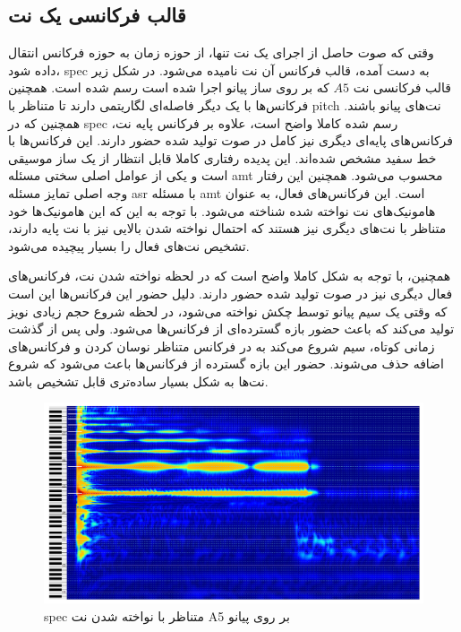 \subsection{قالب فرکانسی یک نت}
وقتی که صوت حاصل از اجرای یک نت تنها، از حوزه زمان به حوزه فرکانس انتقال داده
شود، \gls{spec} به دست آمده، قالب فرکانس آن نت نامیده می‌شود. در شکل زیر قالب
فرکانسی نت $A5$ که بر روی ساز پیانو اجرا شده است رسم شده است. همچنین فرکانس‌ها
با یک دیگر فاصله‌ای لگاریتمی دارند تا متناظر با \gls{pitch} نت‌های پیانو باشند.
همچنین که در \gls{spec} رسم شده کاملا واضح است، علاوه بر فرکانس پایه نت،
فرکانس‌های پایه‌ای دیگری نیز کامل در صوت تولید شده حضور دارند. این فرکانس‌ها با
خط سفید مشخص شده‌اند. این پدیده رفتاری کاملا قابل انتظار از یک ساز موسیقی است و
یکی از عوامل اصلی سختی مسئله \gls{amt} محسوب می‌شود. همچنین این رفتار وجه اصلی
تمایز مسئله \gls{asr} با مسئله \gls{amt} است. این فرکانس‌‌های فعال، به عنوان
هامونیک‌های نت نواخته شده شناخته می‌شود. با توجه به این که این هامونیک‌ها خود
متناظر با نت‌های دیگری نیز هستند که احتمال نواخته شدن بالایی نیز با نت پایه
دارند، تشخیص نت‌های فعال را بسیار پیچیده می‌شود.

همچنین، با توجه به شکل کاملا واضح است که در لحظه نواخته شدن نت، فرکانس‌های فعال
دیگری نیز در صوت تولید شده حضور دارند. دلیل حضور این فرکانس‌ها این است که وقتی
یک سیم پیانو توسط چکش نواخته می‌شود، در لحظه شروع حجم زیادی نویز تولید می‌کند که
باعث حضور بازه گسترده‌ای از فرکانس‌ها می‌شود. ولی پس از گذشت زمانی کوتاه، سیم
شروع می‌کند به در فرکانس متناظر نوسان کردن و فرکانس‌های اضافه حذف می‌شوند. حضور
این بازه گسترده از فرکانس‌ها باعث می‌شود که شروع نت‌ها به شکل بسیار ساده‌تری
قابل تشخیص باشد.
\begin{figure}[ht]
    \centering
    \includegraphics[width=15cm]{./statics/a5_spec.png}
    \caption{\gls{spec} متناظر با نواخته شدن نت A5 بر روی پیانو}
\end{figure}

